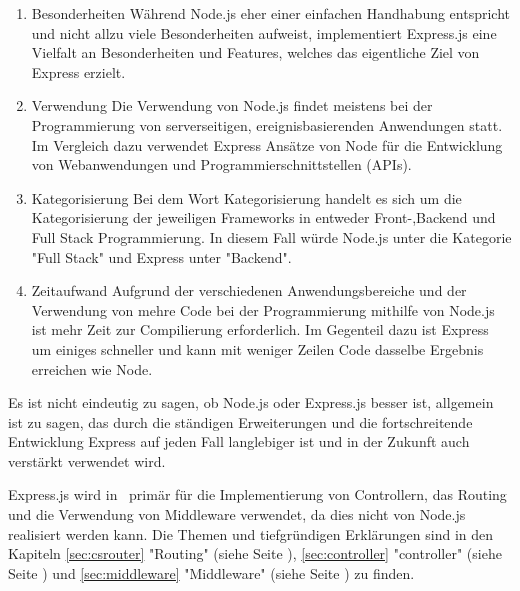 \begin{enumerate}
    \item Besonderheiten
    \newline
    Während Node.js eher einer einfachen Handhabung entspricht und nicht allzu viele Besonderheiten aufweist, implementiert Express.js eine Vielfalt an Besonderheiten und Features, welches das eigentliche Ziel von Express erzielt.\cite{NodeExp}
    \item Verwendung
    \newline
    Die Verwendung von Node.js findet meistens bei der Programmierung von serverseitigen, ereignisbasierenden Anwendungen statt. Im Vergleich dazu verwendet Express Ansätze von Node für die Entwicklung von Webanwendungen und Programmierschnittstellen (APIs). \cite{NodeExp}
    \item Kategorisierung
    \newline
    Bei dem Wort Kategorisierung handelt es sich um die Kategorisierung der jeweiligen Frameworks in entweder Front-,Backend und Full Stack Programmierung. In diesem Fall würde Node.js unter die Kategorie "Full Stack" und Express unter "Backend".\cite{NodeExp}
    \item Zeitaufwand
    \newline
    Aufgrund der verschiedenen Anwendungsbereiche und der Verwendung von mehre Code bei der Programmierung mithilfe von Node.js ist mehr Zeit zur Compilierung erforderlich. Im Gegenteil dazu ist Express um einiges schneller und kann mit weniger Zeilen Code dasselbe Ergebnis erreichen wie Node.\cite{NodeExp}
\end{enumerate} 

Es ist nicht eindeutig zu sagen, ob Node.js oder Express.js besser ist, allgemein ist zu sagen, das durch die ständigen Erweiterungen und die fortschreitende Entwicklung Express auf jeden Fall langlebiger ist und in der Zukunft auch verstärkt verwendet wird. \cite{NodeExp}

Express.js wird in \ZELIA\ primär für die Implementierung von Controllern, das Routing und die Verwendung von Middleware verwendet, da dies nicht von Node.js realisiert werden kann. Die Themen und tiefgründigen Erklärungen sind in den Kapiteln \ref{sec:csrouter} "Routing" (siehe Seite \pageref{sec:csrouter}), \ref{sec:controller} "controller" (siehe Seite \pageref{sec:controller}) und \ref{sec:middleware} "Middleware" (siehe Seite \pageref{sec:middleware}) zu finden. \cite{NodeExp}
